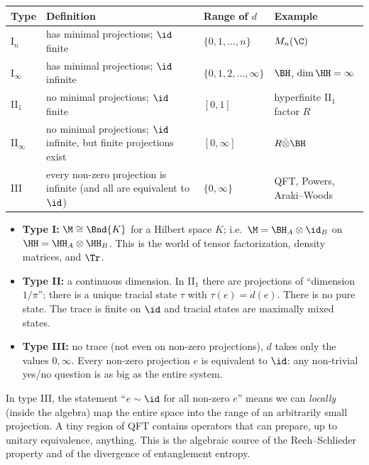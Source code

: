 \begin{center}
\renewcommand{\arraystretch}{1.35}
\begin{tabular}{@{}l p{3.8cm} l l@{}}
\toprule
Type & Definition & Range of $d$ & Example\\
\midrule
I$_n$ & has minimal projections; $\id$ finite & $\{0,1,\dots,n\}$ & $M_n(\C)$\\
I$_\infty$ & has minimal projections; $\id$ infinite & $\{0,1,2,\dots,\infty\}$ & $\BH$, $\dim\HH=\infty$\\
II$_1$ & no minimal projections; $\id$ finite & $[0,1]$ & hyperfinite II$_1$ factor $R$\\
II$_\infty$ & no minimal projections; $\id$ infinite, but finite projections exist & $[0,\infty]$ & $R\bar\otimes\BH$\\
III & every non-zero projection is infinite (and all are equivalent to $\id$) & $\{0,\infty\}$ & QFT, Powers, Araki--Woods\\
\bottomrule
\end{tabular}
\end{center}

\begin{itemize}
\item \textbf{Type I:} $\M\cong\Bnd{K}$ for a Hilbert space $K$; i.e.\ $\M=\BH_A\otimes\id_B$ on $\HH=\HH_A\otimes\HH_B$. This is the world of tensor factorization, density matrices, and $\Tr$.
\item \textbf{Type II:} a continuous dimension. In II$_1$ there are projections of ``dimension $1/\pi$''; there is a unique tracial state $\tau$ with $\tau(e)=d(e)$. There is no pure state. The trace is finite on $\id$ and tracial states are maximally mixed states.
\item \textbf{Type III:} no trace (not even on non-zero projections), $d$ takes only the values $0,\infty$. Every non-zero projection $e$ is equivalent to $\id$: any non-trivial yes/no question is as big as the entire system.
\end{itemize}

\begin{whatwrong}
In type III, the statement ``$e\sim\id$ for all non-zero $e$'' means we can \emph{locally} (inside the algebra) map the entire space into the range of an arbitrarily small projection. A tiny region of QFT contains operators that can prepare, up to unitary equivalence, anything. This is the algebraic source of the Reeh--Schlieder property and of the divergence of entanglement entropy.
\end{whatwrong}

